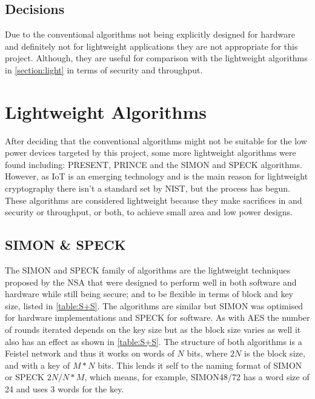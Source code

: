 \documentclass[12pt,twoside,a4paper]{report}
\begin{document}
	\subsection{Decisions}
	Due to the conventional algorithms not being explicitly designed for hardware and definitely not for lightweight applications they are not appropriate for this project. Although, they are useful for comparison with the lightweight algorithms in \autoref{section:light} in terms of security and throughput.
    
	\section{Lightweight Algorithms}
	\label{section:light}
	After deciding that the conventional algorithms might not be suitable for the low power devices targeted by this project, some more lightweight algorithms were found including: PRESENT\cite{Bogdanov2007}, PRINCE\cite{Borghoff2012} and the SIMON and SPECK algorithms\cite{Beaulieu2013}. However, as IoT is an emerging technology and is the main reason for lightweight cryptography there isn't a standard set by NIST, but the process has begun\cite{Mckay}. These algorithms are considered lightweight because they make sacrifices in and security or throughput, or both, to achieve small area and low power designs.
    
	\subsection{SIMON \& SPECK}
	The SIMON and SPECK family of algorithms are the lightweight techniques proposed by the NSA that were designed to perform well in both software and hardware while still being secure; and to be flexible in terms of block and key size, listed in \autoref{table:S+S}. The algorithms are similar but SIMON was optimised for hardware implementations and SPECK for software. As with AES the number of rounds iterated depends on the key size but as the block size varies as well it also has an effect as shown in \autoref{table:S+S}. The structure of both algorithms is a Feistel network and thus it works on words of $N$ bits, where $2N$ is the block size, and with a key of $M*N$ bits. This lends it self to the naming format of SIMON or SPECK $2N/N*M$, which means, for example, SIMON48/72 has a word size of 24 and uses 3 words for the key.
    
\end{document}
